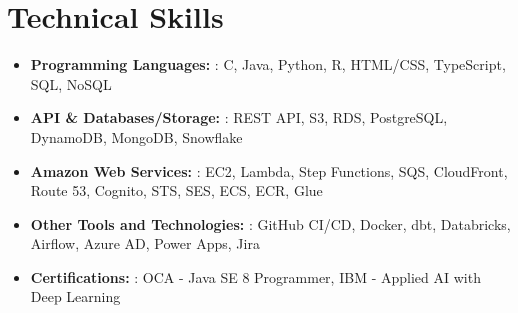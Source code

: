 \documentclass[letterpaper,10pt]{article}
\newcommand{\resumeItem}[2]{
    \item\small{
        \textbf{#1}{: #2 \vspace{-2pt}}
    }
}
\newcommand{\resumeSubItem}[2]{\resumeItem{#1}{#2}\vspace{-4pt}}
\newcommand{\resumeSubHeadingListStart}{\begin{itemize}[leftmargin=*]}
\newcommand{\resumeSubHeadingListEnd}{\end{itemize}}
\begin{document}
\section{Technical Skills}
	\resumeSubHeadingListStart
		\resumeSubItem{Programming Languages: }
			{C, Java, Python, R, HTML/CSS, TypeScript, SQL, NoSQL}
		\resumeSubItem{API \& Databases/Storage: }
			{REST API, S3, RDS, PostgreSQL, DynamoDB, MongoDB, Snowflake}
		\resumeSubItem{Amazon Web Services: }
			{EC2, Lambda, Step Functions, SQS, CloudFront, Route 53, Cognito, STS, SES, ECS, ECR, Glue}
		\resumeSubItem{Other Tools and Technologies: }
			{GitHub CI/CD, Docker, dbt, Databricks, Airflow, Azure AD, Power Apps, Jira}
		\resumeSubItem{Certifications: }
			{OCA - Java SE 8 Programmer, IBM - Applied AI with Deep Learning}
	\resumeSubHeadingListEnd

\end{document}
